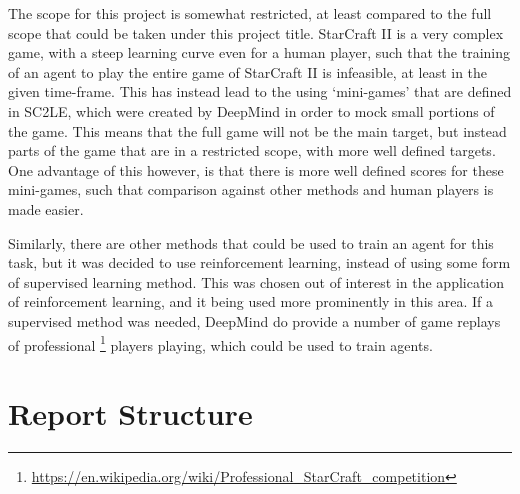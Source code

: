 The scope for this project is somewhat restricted, at least compared to the full
scope that could be taken under this project title. StarCraft II is a very complex
game, with a steep learning curve even for a human player, such that the training
of an agent to play the entire game of StarCraft II is infeasible, at least in the
given time-frame. This has instead lead to the using `mini-games' that are defined
in SC2LE, which were created by DeepMind in order to mock small portions of the
game. This means that the full game will not be the main target, but instead
parts of the game that are in a restricted scope, with more well defined targets.
One advantage of this however, is that there is more well defined scores for
these mini-games, such that comparison against other methods and human players is
made easier.

Similarly, there are other methods that could be used to train an agent for this
task, but it was decided to use reinforcement learning, instead of using some
form of supervised learning method. This was chosen out of interest in the
application of reinforcement learning, and it being used more prominently
in this area.
If a supervised method was needed, DeepMind
do provide a number of game replays of professional%
\footnote{\url{https://en.wikipedia.org/wiki/Professional_StarCraft_competition}}
players playing, which could
be used to train agents.

\section{Report Structure}
